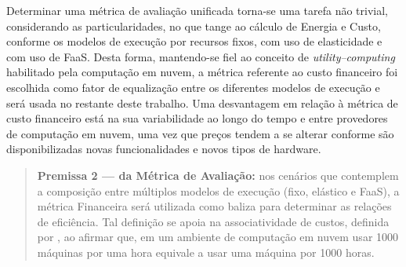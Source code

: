 \documentclass[english,brazilian]{UNISINOSmonografia} %
\begin{document}
Determinar uma métrica de avaliação unificada torna-se uma tarefa não trivial, considerando as particularidades, no que tange ao cálculo de Energia e Custo, conforme os modelos de execução por recursos fixos, com uso de elasticidade e com uso de FaaS.
Desta forma, mantendo-se fiel ao conceito de \textit{utility--computing} habilitado pela computação em nuvem, a métrica referente ao custo financeiro foi escolhida como fator de equalização entre os diferentes modelos de execução e será usada no restante deste trabalho.
Uma desvantagem em relação à métrica de custo financeiro está na sua variabilidade ao longo do tempo e entre provedores de computação em nuvem, uma vez que preços tendem a se alterar conforme são disponibilizadas novas funcionalidades e novos tipos de hardware.
\begin{quote}
	\textbf{Premissa 2 --- da Métrica de Avaliação:} nos cenários que contemplem a composição entre múltiplos modelos de execução (fixo, elástico e FaaS), a métrica Financeira será utilizada como baliza para determinar as relações de eficiência. Tal definição se apoia na associatividade de custos, definida por , ao afirmar que, em um ambiente de computação em nuvem usar 1000 máquinas por uma hora equivale a usar uma máquina por 1000 horas.
\end{quote}
\end{document}
